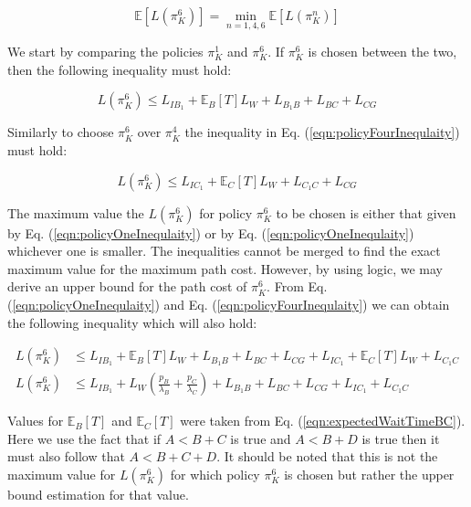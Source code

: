 \documentclass[a4paper,12pt]{article}
\begin{document}
			\begin{equation}
			\mathbb{E}\left[L\left(\pi_{K}^{6}\right)\right] = \min_{n=1,4,6} \mathbb{E}\left[L\left(\pi_{K}^{n}\right)\right]
			\label{eqn:minimumExpectationSimplified}
			\end{equation}
	
			We start by comparing the policies $\pi_{K}^{1}$ and $\pi_{K}^{6}$. If $\pi_{K}^{6}$ is chosen between the two, then the following inequality must hold:
			
			\begin{equation}
				 L\left(\pi_{K}^{6}\right) \leq L_{IB_1} + \mathbb{E}_{B}\left[T\right]L_W + L_{B_1B} + L_{BC} + L_{CG}
			\label{eqn:policyOneInequlaity}
			\end{equation}
			
			Similarly to choose $\pi_{K}^{6}$ over $\pi_{K}^{4}$ the inequality in Eq. (\ref{eqn:policyFourInequlaity}) must hold:
			
			\begin{equation}
				 L\left(\pi_{K}^{6}\right) \leq L_{IC_1} + \mathbb{E}_{C}\left[T\right]L_W + L_{C_1C} + L_{CG}
			\label{eqn:policyFourInequlaity}
			\end{equation}
			
			The maximum value the $L\left(\pi_{K}^{6}\right)$ for policy $\pi_{K}^{6}$ to be chosen is either that given by Eq. (\ref{eqn:policyOneInequlaity}) or by Eq. (\ref{eqn:policyOneInequlaity}) whichever one is smaller. The inequalities cannot be merged to find the exact maximum value for the maximum path cost.  However, by using logic, we may derive an upper bound for the path cost of $\pi_{K}^{6}$. From Eq. (\ref{eqn:policyOneInequlaity}) and Eq. (\ref{eqn:policyFourInequlaity}) we can obtain the following inequality which will also hold:
			
			\begin{equation}
				\begin{split}
					L\left(\pi_{K}^{6}\right) &\leq L_{IB_1} + \mathbb{E}_{B}\left[T\right]L_W + L_{B_1B} + L_{BC} + L_{CG} + L_{IC_1} + \mathbb{E}_{C}\left[T\right]L_W + L_{C_1C} \\
					L\left(\pi_{K}^{6}\right) &\leq L_{IB_1} + L_W(\frac{p_B}{\lambda_{B}} + \frac{p_C}{\lambda_{C}}) + L_{B_1B} + L_{BC} + L_{CG} + L_{IC_1} + L_{C_1C}
				\end{split}
				\label{eqn:finalInequality}
			\end{equation}
			
			Values for $\mathbb{E}_{B}\left[T\right]$ and $\mathbb{E}_{C}\left[T\right]$ were taken from Eq. (\ref{eqn:expectedWaitTimeBC}). Here we use the fact that if $A<B+C$ is true and $A<B+D$ is true then it must also follow that $A<B+C+D$. It should be noted that this is not the maximum value for $L\left(\pi_{K}^{6}\right)$ for which policy $\pi_{K}^{6}$ is chosen but rather the upper bound estimation for that value.
			
\end{document}

